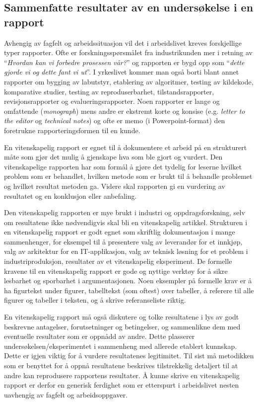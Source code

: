 \documentclass{article}
\begin{document}
\subsection{Sammenfatte resultater av en undersøkelse i en rapport}
Avhengig av fagfelt og arbeidssituasjon vil det i arbeidslivet kreves forskjellige typer rapporter. Ofte er forskningsspørsmålet fra industrikunden mer i retning av ``\emph{Hvordan kan vi forbedre prosessen vår?}'' og rapporten er bygd opp som ``\emph{dette gjorde vi og dette fant vi ut}''. I yrkeslivet kommer man også borti blant annet rapporter om bygging av labutstyr, etablering av algoritmer, testing av kildekode, komparative studier, testing av reproduserbarhet, tilstandsrapporter, revisjonsrapporter og evalueringsrapporter. Noen rapporter er lange og omfattende (\emph{monograph}) mens andre er ekstremt korte og konsise (e.g. \emph{letter to the editor} og \emph{technical notes}) og ofte er memo (i Powerpoint-format) den foretrukne rapporteringsformen til en kunde.

En vitenskapelig rapport er egnet til å dokumentere et arbeid på en strukturert måte som gjør det mulig å gjenskape hva som ble gjort og vurdert.
Den vitenskapelige rapporten har som formål å gjøre det tydelig for leserne hvilket problem som er behandlet, hvilken metode som er brukt til å behandle problemet og hvilket resultat metoden ga.
Videre skal rapporten gi en vurdering av resultatet og en konklusjon eller anbefaling.

Den vitenskapelig rapporten er mye brukt i industri og oppdragsforskning, selv om resultatene ikke nødvendigvis skal bli en vitenskapelig artikkel.
Strukturen i en vitenskapelig rapport er godt egnet som skriftlig dokumentasjon i mange sammenhenger, for eksempel til å presentere valg av leverandør for et innkjøp, valg av arkitektur for en IT-applikasjon, valg av teknisk løsning for et problem i industriproduksjon, resultater av et vitenskapelig eksperiment.
De formelle kravene til en vitenskapelig rapport er gode og nyttige verktøy for å sikre lesbarhet og sporbarhet i argumentasjonen.
Noen eksempler på formelle krav er å ha figurtekst under figurer, tabelltekst (som oftest) over tabeller, å referere til alle figurer og tabeller i teksten, og å skrive referanseliste riktig.

En vitenskapelig rapport må også diskutere og tolke resultatene i lys av godt beskrevne antagelser, forutsetninger og betingelser, og sammenlikne dem med eventuelle resultater som er oppnådd av andre.
Dette plasserer undersøkelsen/eksperimentet i sammenheng med allerede etablert kunnskap.
Dette er igjen viktig for å vurdere resultatenes legitimitet.
Til sist må metodikken som er benyttet for å oppnå resultatene beskrives tilstrekkelig detaljert til at andre kan reprodusere rapportens resultater.
Å kunne skrive en vitenskapelig rapport er derfor en generisk ferdighet som er etterspurt i arbeidslivet nesten uavhengig av fagfelt og arbeidsoppgaver.
\end{document}
